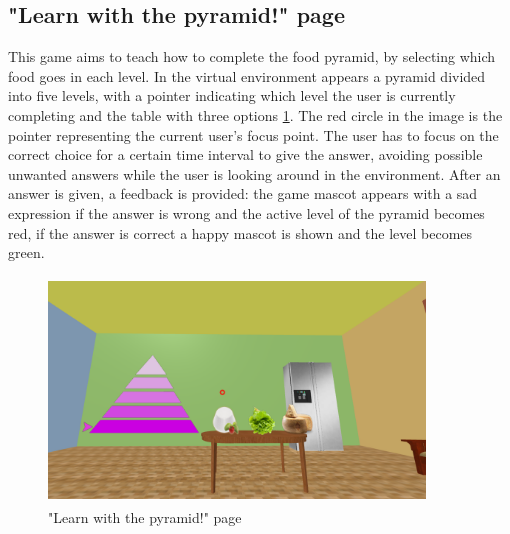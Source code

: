 \subsection{"Learn with the pyramid!" page}
This game aims to teach how to complete the food pyramid, by selecting which food goes in each level. In the virtual environment appears a pyramid divided into five levels, with a pointer indicating which level the user is currently completing and the table with three options \ref{fig:pyramid}. The red circle in the image is the pointer representing the current user's focus point. The user has to focus on the correct choice for a certain time interval to give the answer, avoiding possible unwanted answers while the user is looking around in the environment. After an answer is given, a feedback is provided: the game mascot appears with a sad expression if the answer is wrong and the active level of the pyramid becomes red, if the answer is correct a happy mascot is shown and the level becomes green.\\
\begin{figure}[H]
\centering
\includegraphics[width=10cm, height=6cm]{immagini/Pyramid.png}
\caption{"Learn with the pyramid!" page}\label{fig:pyramid}
\end{figure}
